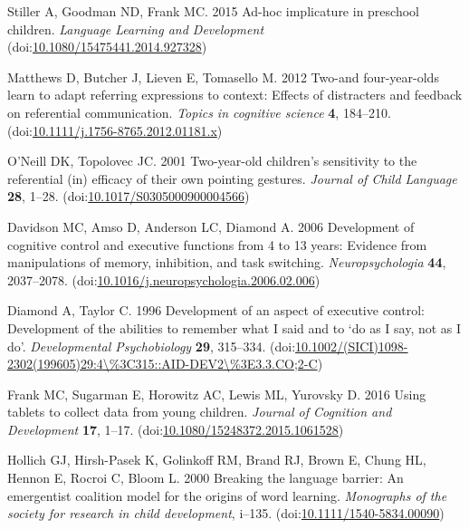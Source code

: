 \documentclass{rsos}
\begin{document}
\begin{thebibliography}{10}
\hypertarget{ref-stiller2015}{}
 Stiller A, Goodman ND, Frank MC. 2015 Ad-hoc implicature in
preschool children. \emph{Language Learning and Development}
(doi:\href{https://doi.org/10.1080/15475441.2014.927328}{10.1080/15475441.2014.927328})

\hypertarget{ref-matthews2012}{}
 Matthews D, Butcher J, Lieven E, Tomasello M. 2012 Two-and
four-year-olds learn to adapt referring expressions to context: Effects
of distracters and feedback on referential communication. \emph{Topics
in cognitive science} \textbf{4}, 184--210.
(doi:\href{https://doi.org/10.1111/j.1756-8765.2012.01181.x}{10.1111/j.1756-8765.2012.01181.x})

\hypertarget{ref-oneill2001}{}
 O'Neill DK, Topolovec JC. 2001 Two-year-old children's sensitivity
to the referential (in) efficacy of their own pointing gestures.
\emph{Journal of Child Language} \textbf{28}, 1--28.
(doi:\href{https://doi.org/10.1017/S0305000900004566}{10.1017/S0305000900004566})

\hypertarget{ref-davidson2006}{}
 Davidson MC, Amso D, Anderson LC, Diamond A. 2006 Development of
cognitive control and executive functions from 4 to 13 years: Evidence
from manipulations of memory, inhibition, and task switching.
\emph{Neuropsychologia} \textbf{44}, 2037--2078.
(doi:\href{https://doi.org/10.1016/j.neuropsychologia.2006.02.006}{10.1016/j.neuropsychologia.2006.02.006})

\hypertarget{ref-diamond1996}{}
 Diamond A, Taylor C. 1996 Development of an aspect of executive
control: Development of the abilities to remember what I said and to `do
as I say, not as I do'. \emph{Developmental Psychobiology} \textbf{29},
315--334.
(doi:\href{https://doi.org/10.1002/(SICI)1098-2302(199605)29:4/\%3C315::AID-DEV2/\%3E3.3.CO;2-C}{10.1002/(SICI)1098-2302(199605)29:4\textbackslash{}\%3C315::AID-DEV2\textbackslash{}\%3E3.3.CO;2-C})

\hypertarget{ref-frank2016}{}
 Frank MC, Sugarman E, Horowitz AC, Lewis ML, Yurovsky D. 2016 Using
tablets to collect data from young children. \emph{Journal of Cognition
and Development} \textbf{17}, 1--17.
(doi:\href{https://doi.org/10.1080/15248372.2015.1061528}{10.1080/15248372.2015.1061528})

\hypertarget{ref-hollich2000}{}
 Hollich GJ, Hirsh-Pasek K, Golinkoff RM, Brand RJ, Brown E, Chung
HL, Hennon E, Rocroi C, Bloom L. 2000 Breaking the language barrier: An
emergentist coalition model for the origins of word learning.
\emph{Monographs of the society for research in child development},
i--135.
(doi:\href{https://doi.org/10.1111/1540-5834.00090}{10.1111/1540-5834.00090})


\end{thebibliography}
\end{document}
